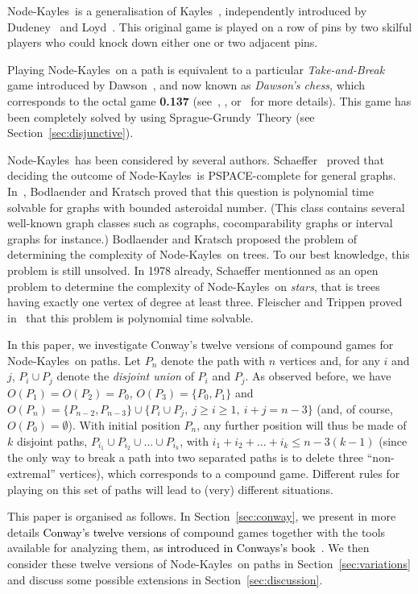 \documentclass[11pt]{article}
\newcommand{\modif}[1]{\textcolor{black}{#1}}
\newcommand{\NK}{Node-Kayles}
\newcommand{\SP}{Sprague-Grundy}
\begin{document}
\NK\ is a generalisation of Kayles~\cite[Chapter~4]{WW}, independently introduced
by Dudeney~\cite{DUDENEY-10} and Loyd~\cite{LOYD-14}. 
This original game is played on a row of pins by two skilful
players who could knock down either one or two adjacent pins. 

Playing \NK\ on a path is equivalent
to a particular {\em Take-and-Break} game introduced by
Dawson~\cite{DAWSON-35}, and now known as {\em Dawson's chess}, which
corresponds to the octal game {\bf 0.137} (see~\cite[Chapter~4]{WW},
 \cite[Chapter~11]{ONAG}, or~\cite{WEB-FLAMMENKAMP} for more details).
This game has been completely solved by using \SP\ Theory (see
Section~\ref{sec:disjunctive}).

\NK\ has been considered by several authors.
Schaeffer~\cite{SCHAEFFER-78} proved that deciding the outcome of
\NK\ is PSPACE-complete for general graphs. In~\cite{BODLAENDER-KRATSCH-02},
Bodlaender and Kratsch proved that this question is polynomial time solvable
for graphs with bounded asteroidal number. (This class contains several
well-known graph classes such as cographs,
cocomparability graphs or interval graphs for instance.)
Bodlaender and Kratsch proposed the problem of determining the complexity
of \NK\ on trees. To our best knowledge, this problem is still unsolved.
In 1978 already, Schaeffer mentionned as an open problem to determine
the complexity of \NK\ on {\em stars}, that is trees having exactly one
vertex of degree at least three. Fleischer and Trippen proved
in~\cite{FLEISCHER-TRIPPEN-04}
that this problem is polynomial time solvable.

In this paper, we investigate Conway's twelve versions of compound games for
\NK\ on paths. Let $P_n$ denote the path with $n$ vertices and, for any $i$ and $j$,
$P_i\cup P_j$ denote the {\em disjoint union} of $P_i$ and $P_j$. As observed before, we
have $O(P_1)=O(P_2)=P_0$,
$O(P_3)=\{P_0,P_1\}$
and $O(P_n)=\{P_{n-2},P_{n-3}\}\cup\{P_i\cup P_j,\ j\ge i\ge 1,\ i+j=n-3\}$
(and, of course, $O(P_0)=\emptyset$).
With initial position $P_n$, any further position will thus be made of
$k$ disjoint paths, $P_{i_1}\cup P_{i_2}\cup\dots\cup P_{i_k}$,
with $i_1+i_2+\dots +i_k\le n-3(k-1)$ (since the only way to break
a path into two separated paths is to delete three ``non-extremal'' vertices),
which corresponds to a compound game.
Different rules for playing on this set of paths will lead to (very)
different situations.

This paper is organised as follows. In Section~\ref{sec:conway}, we present
in more details \modif{Conway's twelve versions} of compound games 
together with the tools
available for analyzing them,
\modif{as introduced in Conways's book~\cite[Chapter~14]{ONAG}}. 
We then consider these twelve versions 
of \NK\ on paths in Section~\ref{sec:variations} and discuss some 
possible extensions
in Section~\ref{sec:discussion}.
\end{document}
